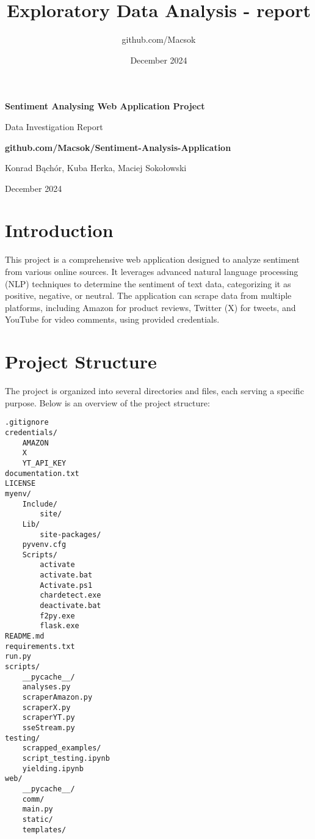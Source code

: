 \documentclass[a4paper]{article}
\title{Exploratory Data Analysis - report}
\author{github.com/Macsok}
\date{December 2024}
\begin{document}
\begin{titlepage}
   \begin{center}
        \vspace*{2cm}

        \Huge
        \textbf{Sentiment Analysing Web Application Project}
        \vspace{0.5cm}

        \LARGE
        Data Investigation Report
        \vspace{5.5cm}
       
        \textbf{github.com/Macsok/Sentiment-Analysis-Application}

        \vspace{10cm}
        Konrad Bąchór, Kuba Herka, Maciej Sokołowski

        \Large
        \vfill
        December 2024   
   \end{center}
\end{titlepage}

\tableofcontents
\newpage

\section{Introduction}
This project is a comprehensive web application designed to analyze sentiment from various online sources. It leverages advanced natural language processing (NLP) techniques to determine the sentiment of text data, categorizing it as positive, negative, or neutral. The application can scrape data from multiple platforms, including Amazon for product reviews, Twitter (X) for tweets, and YouTube for video comments, using provided credentials.

\section{Project Structure}
The project is organized into several directories and files, each serving a specific purpose. Below is an overview of the project structure:

\begin{verbatim}
.gitignore
credentials/
    AMAZON
    X
    YT_API_KEY
documentation.txt
LICENSE
myenv/
    Include/
        site/
    Lib/
        site-packages/
    pyvenv.cfg
    Scripts/
        activate
        activate.bat
        Activate.ps1
        chardetect.exe
        deactivate.bat
        f2py.exe
        flask.exe
README.md
requirements.txt
run.py
scripts/
    __pycache__/
    analyses.py
    scraperAmazon.py
    scraperX.py
    scraperYT.py
    sseStream.py
testing/
    scrapped_examples/
    script_testing.ipynb
    yielding.ipynb
web/
    __pycache__/
    comm/
    main.py
    static/
    templates/
\end{verbatim}
\end{document}
